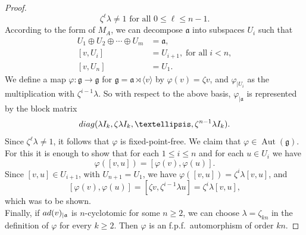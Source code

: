 \documentclass[10pt,a4paper]{amsart}
\DeclareMathOperator{\Aut}{Aut}
\newcommand{\La}{\mathfrak{a}}
\newcommand{\Lg}{\mathfrak{g}}
\newcommand{\ad}{{\rm ad}}
\newcommand{\la}{\lambda}
\renewcommand{\phi}{\varphi}
\newcommand{\ra}{\rightarrow}
\begin{document}
\begin{proof}
\[
\zeta^{\ell}\la\neq 1 \text{ for all } 0\le \ell \le n-1.
\]
According to the form of $M_A$, we can decompose $\La$ into subspaces $U_i$ such that
\begin{align*}
U_1\oplus U_2\oplus \cdots \oplus U_m & = \La, \\
[v,U_i] & = U_{i+1},\; \text{for all} \; i<n,\\
[v,U_n] & = U_1.
\end{align*}
We define a map $\phi\colon \Lg\ra \Lg$ for $\Lg=\La\rtimes \langle v\rangle$ by $\phi(v)=\zeta v$, and
$\phi_{\mid U_i}$ as the multiplication with $\zeta^{i-1}\la$. So with respect to the above basis, $\phi_{\mid \La}$
is represented by the block matrix
\[
{\rm diag}(\la I_k,\zeta \la I_k,\ldots ,\zeta^{n-1}\la I_k).
\]
Since $\zeta^{\ell}\la\neq 1$, it follows that $\phi$ is fixed-point-free. We claim that
$\phi\in \Aut(\Lg)$. For this it is enough to show that for
each $1\le i\le n$ and for each $u\in U_i$
we have
\[
\phi([v,u])=[\phi(v),\phi(u)].
\]
Since $[v,u]\in U_{i+1}$, with $U_{n+1}=U_1$, we have $\phi([v,u])=\zeta^i\la [v,u]$, and
\[
[\phi(v),\phi(u)]=[\zeta v,\zeta^{i-1}\la u]=\zeta^i\la [v,u],
\]
which was to be shown. \\[0.2cm]
Finally, if $\ad(v)_{\mid \La}$ is $n$-cyclotomic for some $n\ge 2$, we can choose 
$\la=\zeta_{kn}$ in the definition of $\phi$ for every $k\ge 2$. Then
$\phi$ is an f.p.f.\ automorphism of order $kn$. 
\end{proof}  
\end{document}
